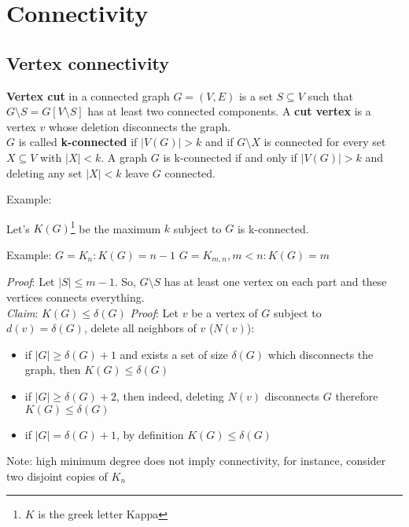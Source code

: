 \documentclass[main]{subfiles}
\begin{document}

\section{Connectivity}

\subsection{Vertex connectivity}

\textbf{Vertex cut} in a connected graph $G = (V,E)$ is a set $S \subseteq V$ such that $G \setminus S = G[V \setminus S]$ has at least two connected components. A \textbf{cut vertex} is a vertex $v$ whose deletion disconnects the graph.\\
$G$ is called \textbf{k-connected} if $|V(G)| > k$ and if $G \setminus X$ is connected for every set $X \subseteq V$ with $|X| < k$. A graph $G$ is k-connected if and only if $|V(G)| > k$ and deleting any set $|X| < k$ leave $G$ connected.

Example:

Let's $K(G)$\footnote{$K$ is the greek letter Kappa} be the maximum $k$ subject to $G$ is k-connected.

Example:
$G = K_{n}: K(G) = n-1$
$G = K_{m,n}, m < n: K(G) = m$

\textit{Proof}: Let $|S| \leq m-1$. So, $G \setminus S$ has at least one vertex on each part and these vertices connects everything.
\\
\textit{Claim}: $K(G) \leq \delta(G)$
\textit{Proof}: Let $v$ be a vertex of $G$ subject to $d(v) = \delta(G)$, delete all neighbors of $v$ ($N(v)$):
\begin{itemize}
\item if $|G| \geq \delta(G) + 1$ and exists a set of size $\delta(G)$ which disconnects the graph, then $K(G) \leq \delta(G)$
\item if $|G| \geq \delta(G) + 2$, then indeed, deleting $N(v)$ disconnects $G$ therefore $K(G) \leq \delta(G)$
\item if $|G| = \delta(G) + 1$, by definition $K(G) \leq \delta(G)$
\end{itemize}

Note: high minimum degree does not imply connectivity, for instance, consider two disjoint copies of $K_{n}$
\end{document}
